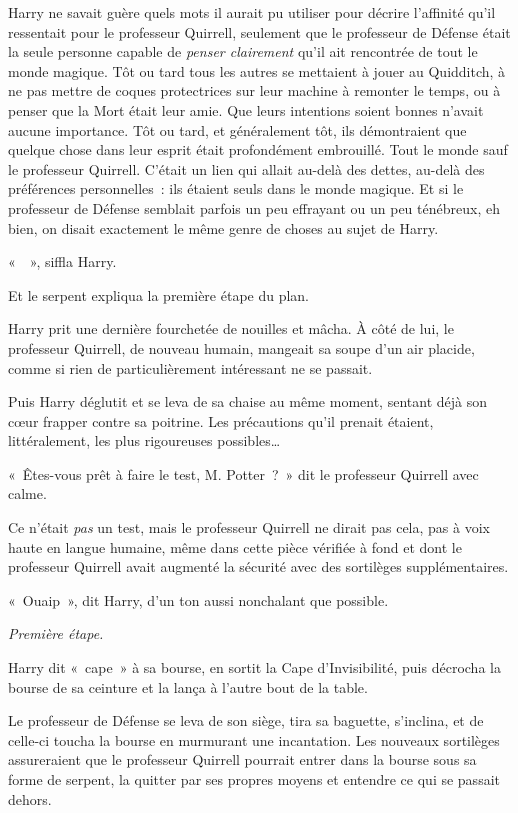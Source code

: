 Harry ne savait guère quels mots il aurait pu utiliser pour décrire l'affinité qu'il ressentait pour le professeur Quirrell, seulement que le professeur de Défense était la seule personne capable de \emph{penser clairement} qu'il ait rencontrée de tout le monde magique.
Tôt ou tard tous les autres se mettaient à jouer au Quidditch, à ne pas mettre de coques protectrices sur leur machine à remonter le temps, ou à penser que la Mort était leur amie.
Que leurs intentions soient bonnes n'avait aucune importance.
Tôt ou tard, et généralement tôt, ils démontraient que quelque chose dans leur esprit était profondément embrouillé.
Tout le monde sauf le professeur Quirrell.
C'était un lien qui allait au-delà des dettes, au-delà des préférences personnelles~: ils étaient seuls dans le monde magique.
Et si le professeur de Défense semblait parfois un peu effrayant ou un peu ténébreux, eh bien, on disait exactement le même genre de choses au sujet de Harry.

«~~», siffla Harry.

Et le serpent expliqua la première étape du plan.

\later

Harry prit une dernière fourchetée de nouilles et mâcha.
À côté de lui, le professeur Quirrell, de nouveau humain, mangeait sa soupe d'un air placide, comme si rien de particulièrement intéressant ne se passait.

Puis Harry déglutit et se leva de sa chaise au même moment, sentant déjà son cœur frapper contre sa poitrine.
Les précautions qu'il prenait étaient, littéralement, les plus rigoureuses possibles…

«~Êtes-vous prêt à faire le test, M. Potter~?~»
dit le professeur Quirrell avec calme.

Ce n'était \emph{pas} un test, mais le professeur Quirrell ne dirait pas cela, pas à voix haute en langue humaine, même dans cette pièce vérifiée à fond et dont le professeur Quirrell avait augmenté la sécurité avec des sortilèges supplémentaires.

«~Ouaip~», dit Harry, d'un ton aussi nonchalant que possible.

\emph{Première étape.}

Harry dit «~cape~» à sa bourse, en sortit la Cape d'Invisibilité, puis décrocha la bourse de sa ceinture et la lança à l'autre bout de la table.

Le professeur de Défense se leva de son siège, tira sa baguette, s'inclina, et de celle-ci toucha la bourse en murmurant une incantation.
Les nouveaux sortilèges assureraient que le professeur Quirrell pourrait entrer dans la bourse sous sa forme de serpent, la quitter par ses propres moyens et entendre ce qui se passait dehors.

